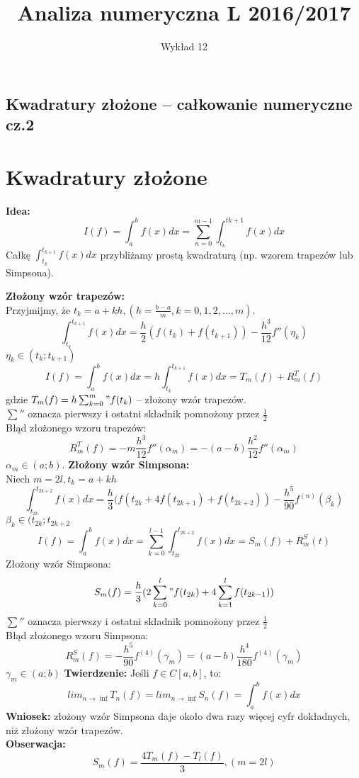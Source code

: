 \documentclass[12pt]{article}
\author{\LARGE Wykład 12}
\title{\bfseries\Huge Analiza numeryczna L 2016/2017}
\date{}
\begin{document}
\maketitle
\begin{center}
\section*{\Large Kwadratury złożone -- całkowanie numeryczne cz.2 }

\end{center}
\vspace{5mm}
\section*{Kwadratury złożone}
\textbf{Idea:}
$$I(f) = \int^b_af(x)dx = \sum^{m-1}_{n=0} \int^{t{k+1}}_{t_k} f(x)dx$$
Całkę $\int^{t_{k+1}}_{t_k} f(x)dx$ przybliżamy prostą kwadraturą (np. wzorem trapezów lub Simpsona).\\
\linebreak


\textbf{Złożony wzór trapezów:}\\
Przyjmijmy, że $t_k=a +kh, (h = \frac{b-a}{m}, k = 0,1,2,...,m)$.
$$\int^{t_{k+1}}_{t_k} f(x)dx = \frac{h}{2}(f(t_k) + f(t_{k+1})) - \frac{h^3}{12}f''(\eta_k)$$
$\eta_k \in (t_k;t_{k+1})$
$$I(f) = \int^b_af(x)dx = h\int^{t_{k+1}}_{t_k} f(x)dx = T_m(f) + R^T_m(f)$$
gdzie $T_m(f) = h \sum^m_{k=0}"f(t_k)$ -- złożony wzór trapezów.\\
\linebreak
$\sum ''$ oznacza pierwszy i ostatni składnik pomnożony przez $\frac{1}{2}$\\
\linebreak
Błąd złożonego wzoru trapezów:
$$R^T_m(f) = -m\frac{h^3}{12}f''(\alpha_m) = -(a-b)\frac{h^2}{12}f''(\alpha_m)$$
$\alpha_m \in (a;b)$.
\newpage
{}
\setcounter{page}{2}
\textbf{Złożony wzór Simpsona:}\\
Niech $m=2l, t_k=a + kh$
$$\int^{t_{2k+2}}_{t_{2k}} f(x)dx = \frac{h}{3}(f(t_{2k} + 4f(t_{2k+1}) +f(t_{2k+2}))- \frac{h^5}{90}f^{(n)}(\beta_k)$$
$\beta_k \in (t_{2k};t_{2k+2}$
$$I(f) = \int^b_af(x)dx = \sum^{l-1}_{k=0} \int^{t_{2k+2}}_{t_{2k}} f(x)dx = S_m(f) + R^S_m(t)$$
Złożony wzór Simpsona:
$$ S_m(f) =  \frac{h}{3}(2 \sum^l_{k=0}"f(t_{2k}) + 4\sum^l_{k=1} f(t_{2k-1}))$$
$\sum ''$ oznacza pierwszy i ostatni składnik pomnożony przez $\frac{1}{2}$\\
\linebreak
Błąd złożonego wzoru Simpsona:
$$R_m^S(f) = -\frac{h^5}{90}f^{(4)}(\gamma_m) = (a-b)\frac{h^4}{180}f^{(4)}(\gamma_m)$$
$\gamma_m \in (a;b)$
\textbf{Twierdzenie:} Jeśli $f \in C[a,b]$, to:
$$ lim_{n \rightarrow \inf} T_n(f) = lim_{n \rightarrow \inf} S_n(f) = \int^b_a f(x)dx $$
\textbf{Wniosek:} złożony wzór Simpsona daje około dwa razy więcej cyfr dokładnych, niż złożony wzór trapezów.\\
\textbf{Obserwacja:}
$$S_m(f) = \frac{4T_m(f) - T_l(f)}{3}, (m=2l)$$
\newpage
\end{document}
